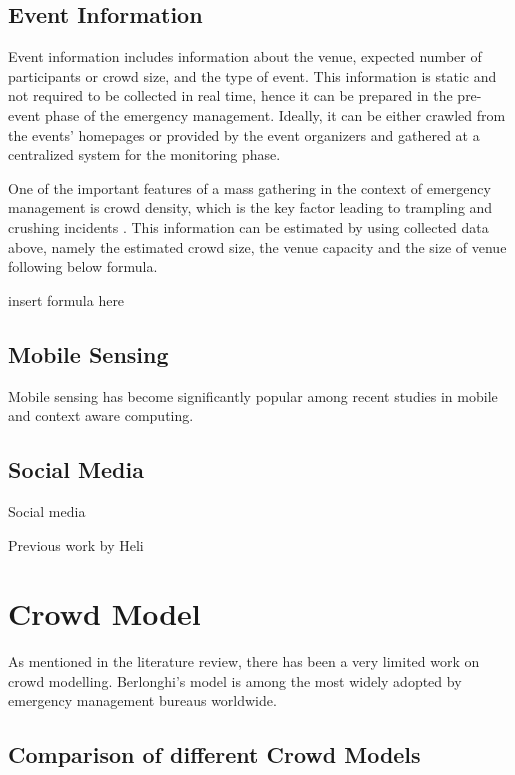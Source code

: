 \subsection{Event Information}
Event information includes information about the venue, expected number of participants or crowd size, and the type of event. This information is static and not required to be collected in real time, hence it can be prepared in the pre-event phase of the emergency management. Ideally, it can be either crawled from the events' homepages or provided by the event organizers and gathered at a centralized system for the monitoring phase.

One of the important features of a mass gathering in the context of emergency management is crowd density, which is the key factor leading to trampling and crushing incidents \citet{Hughes2009}. This information can be estimated by using collected data above, namely the estimated crowd size, the venue capacity and the size of venue following below formula.

insert formula here

\subsection{Mobile Sensing}

Mobile sensing has become significantly popular among recent studies in mobile and context aware computing.

\subsection{Social Media}

Social media

Previous work by Heli

\section{Crowd Model}

As mentioned in the literature review, there has been a very limited work on crowd modelling. Berlonghi's model is among the most widely adopted by emergency management bureaus worldwide. 

\subsection{Comparison of different Crowd Models}

